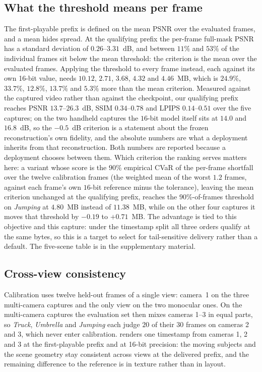 \documentclass[lettersize,journal]{IEEEtran}
\begin{document}
\subsection{What the threshold means per frame}
\label{sec:frames}
The first-playable prefix is defined on the mean PSNR over the evaluated frames,
and a mean hides spread. At the qualifying prefix the per-frame full-mask PSNR
has a standard deviation of $0.26$--$3.31$~dB, and between $11\%$ and $53\%$ of
the individual frames sit below the mean threshold: the criterion is the mean over
the evaluated frames. Applying the threshold
to every frame instead, each against its own 16-bit value, needs $10.12$,
$2.71$, $3.68$, $4.32$ and $4.46$~MB, which is $24.9\%$, $33.7\%$, $12.8\%$,
$13.7\%$ and $5.3\%$ more than the mean criterion.
Measured against the captured video rather than against the checkpoint, our
qualifying prefix reaches PSNR $13.7$--$26.3$~dB, SSIM $0.34$--$0.78$ and LPIPS
$0.14$--$0.51$ over the five captures; on the two handheld captures the $16$-bit
model itself sits at
$14.0$ and $16.8$~dB, so the $-0.5$~dB criterion is a statement about the frozen
reconstruction's own fidelity, and the absolute numbers are what a deployment
inherits from that reconstruction. Both numbers are reported because a deployment chooses between them. Which
criterion the ranking serves matters here: a variant whose score is the $90\%$ empirical CVaR of the per-frame shortfall over
the twelve calibration frames (the weighted mean of the worst $1.2$ frames, against
each frame's own $16$-bit reference minus the tolerance), leaving the mean
criterion unchanged at the qualifying prefix, reaches the $90\%$-of-frames threshold on \emph{Jumping} at $4.80$~MB
instead of $11.38$~MB, while on the other four captures it moves that threshold by
$-0.19$ to $+0.71$~MB. The advantage is tied to this objective and this capture:
under the timestamp split all three orders qualify at the same bytes, so this is
a target to select for tail-sensitive delivery rather than a default. The five-scene table is in the
supplementary material.

\subsection{Cross-view consistency}
\label{sec:crossview}
Calibration uses twelve held-out frames of a single view: camera~1 on the three
multi-camera captures and the only view on the two monocular ones. On the
multi-camera captures the evaluation set then mixes cameras 1--3 in equal parts,
so \emph{Truck}, \emph{Umbrella} and \emph{Jumping} each judge $20$ of their $30$
frames on cameras 2 and 3, which never enter calibration.
 renders one timestamp from cameras 1, 2 and 3 at the
first-playable prefix and at 16-bit precision: the moving subjects and the scene
geometry stay consistent across views at the delivered prefix, and the remaining
difference to the reference is in texture rather than in layout.
\end{document}
